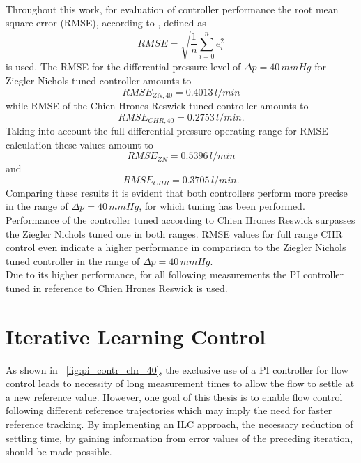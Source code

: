 \\Throughout this work, for evaluation of controller performance the root mean square error (RMSE), according to \cite{RMSE}, defined as
\begin{equation}
  RMSE = \sqrt{\frac{1}{n}\sum_{i=0}^n e_i^2}
\end{equation}
is used. The RMSE for the differential pressure level of $\Delta{p}=40\,mmHg$ for Ziegler Nichols tuned controller amounts to
\begin{equation}
  RMSE_{ZN,40}=0.4013\,l/min
\end{equation}
while RMSE of the Chien Hrones Reswick tuned controller amounts to
\begin{equation}
  RMSE_{CHR,40}=0.2753\,l/min.
\end{equation}
Taking into account the full differential pressure operating range for RMSE calculation these values amount to
\begin{equation}
  RMSE_{ZN}=0.5396\,l/min
\end{equation}
and
\begin{equation}
  RMSE_{CHR}=0.3705\,l/min.
\end{equation}
Comparing these results it is evident that both controllers perform more precise in the range of $\Delta{p}=40\,mmHg$, for which tuning has been performed.
Performance of the controller tuned according to Chien Hrones Reswick surpasses the Ziegler Nichols tuned one in both ranges. RMSE values for full range CHR control even indicate a higher performance in comparison to the Ziegler Nichols tuned controller in the range of $\Delta{p}=40\,mmHg$.
\\ Due to its higher performance, for all following measurements the PI controller tuned in reference to Chien Hrones Reswick is used.
\section{Iterative Learning Control}\label{ILC_1}
As shown in \figurename~\ref{fig:pi_contr_chr_40}, the exclusive use of a PI controller for flow control leads to necessity of long measurement times to allow the flow to settle at a new reference value. However, one goal of this thesis is to enable flow control following different reference trajectories which may imply the need for faster reference tracking. By implementing an ILC approach, the necessary reduction of settling time, by gaining information from error values of the preceding iteration, should be made possible.

